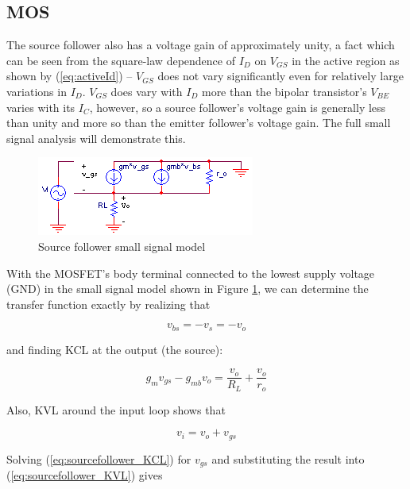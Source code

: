 \subsection{MOS}
The source follower also has a voltage gain of approximately unity, a fact which can be seen from the square-law dependence of $I_{D}$ on $V_{GS}$ in the active region as shown by (\ref{eq:activeId}) -- $V_{GS}$ does not vary significantly even for relatively large variations in $I_{D}$. $V_{GS}$ does vary with $I_{D}$ more than the bipolar transistor's $V_{BE}$ varies with its $I_{C}$, however, so a source follower's voltage gain is generally less than unity and more so than the emitter follower's voltage gain. The full small signal analysis will demonstrate this.
\begin{figure}[h]
	\centering
		\includegraphics{schematics/ss_sourcefollower.PNG}
	\caption{Source follower small signal model}
	\label{fig:ss_sourcefollower}
\end{figure}
\par
With the MOSFET's body terminal connected to the lowest supply voltage (GND) in the small signal model shown in Figure \ref{fig:ss_sourcefollower}, we can determine the transfer function exactly by realizing that

\begin{equation}
v_{bs} = -v_{s} = -v_{o}
\end{equation}

\noindent and finding KCL at the output (the source):

\begin{equation}
g_{m}v_{gs} - g_{mb}v_{o} = \frac{v_{o}}{R_{L}} + \frac{v_{o}}{r_{o}}
\label{eq:sourcefollower_KCL}
\end{equation}

\noindent Also, KVL around the input loop shows that

\begin{equation}
v_{i} = v_{o} + v_{gs}
\label{eq:sourcefollower_KVL}
\end{equation}

\noindent Solving (\ref{eq:sourcefollower_KCL}) for $v_{gs}$ and substituting the result into (\ref{eq:sourcefollower_KVL}) gives


